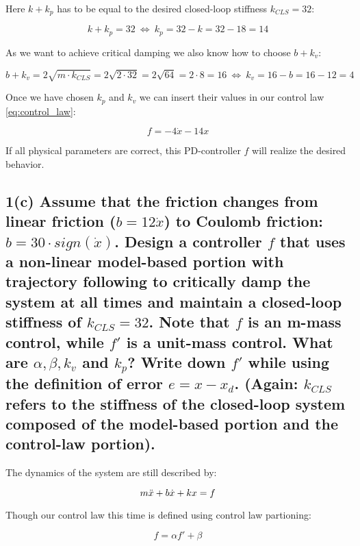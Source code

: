\documentclass[a4paper,10pt]{article}
\begin{document}
Here $k + k_p$ has to be equal to the desired closed-loop stiffness $k_{CLS} = 32$:

\begin{equation}
k + k_p = 32~\Longleftrightarrow~k_p = 32 - k = 32 - 18 = 14
\end{equation}

As we want to achieve critical damping we also know how to choose $b+k_v$:

\begin{equation}
b + k_v = 2\sqrt{m \cdot k_{CLS}} = 2\sqrt{2 \cdot 32} = 2\sqrt{64} = 2 \cdot 8 = 16~\Longleftrightarrow~k_v = 16 - b = 16 - 12 = 4 
\end{equation}

Once we have chosen $k_p$ and $k_v$ we can insert their values in our control law \eqref{eq:control_law}:

\begin{equation}
f = -4\Dot{x} - 14x 
\end{equation}

If all physical parameters are correct, this PD-controller $f$ will realize the desired behavior.

    
\subsection*{1(c) Assume that the friction changes from linear friction ($b = 12\Dot{x}$) to Coulomb friction: $b = 30 \cdot sign(\Dot{x})$. Design a controller $f$ that uses a non-linear model-based portion with trajectory following to critically damp the system at all times and maintain a closed-loop stiffness of $k_{CLS} = 32$. Note that $f$ is an m-mass control, while $f'$ is a unit-mass control. What are $\alpha, \beta, k_v$ and $k_p$? Write down $f'$ while using the definition of error $e = x - x_d$. (Again: $k_{CLS}$ refers to the stiffness of the closed-loop system composed of the model-based portion and the control-law portion).}

The dynamics of the system are still described by:

\begin{equation}\label{eq:sys_dyn_C}
m\Ddot{x} + b\Dot{x} + kx = f
\end{equation}

Though our control law this time is defined using control law partioning:

\begin{equation}\label{eq:control_law_C}
f = \alpha f' + \beta
\end{equation}
\end{document}
